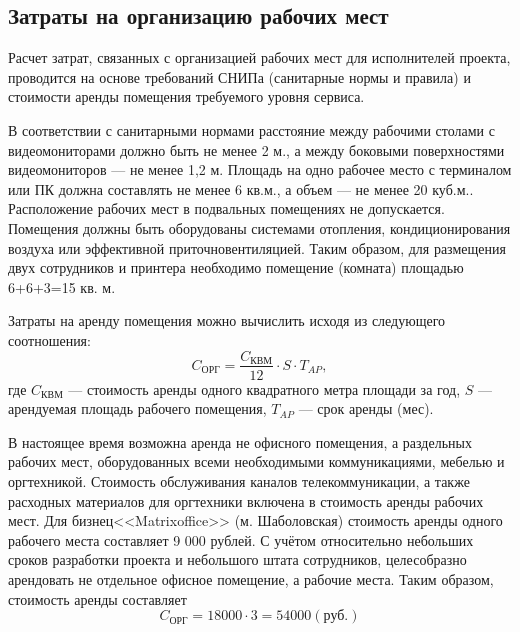 \subsection{Затраты на организацию рабочих мест} \label{office_costs}

Расчет затрат, связанных с организацией рабочих мест для исполнителей проекта, проводится на основе требований СНИПа (санитарные нормы и правила) и стоимости аренды помещения требуемого уровня сервиса.

\vspace{\baselineskip}
В соответствии с санитарными нормами расстояние между рабочими столами с видеомониторами должно быть не менее 2 м., а между боковыми поверхностями видеомониторов --- не менее 1,2 м. Площадь на одно рабочее место с терминалом или ПК должна составлять не менее 6 кв.м., а объем --- не менее 20 куб.м.. Расположение рабочих мест в подвальных помещениях не допускается. Помещения должны быть оборудованы системами отопления, кондиционирования воздуха или эффективной приточно вентиляцией. Таким образом, для размещения двух сотрудников и принтера необходимо помещение (комната) площадью 6+6+3=15 кв. м.

\vspace{\baselineskip}
Затраты на аренду помещения можно вычислить исходя из следующего соотношения:
\begin{equation}
  \label{eq:office_cost_formula}
C_\textrm{ОРГ} = \frac {C_\textrm{КВМ}} {12} \cdot S \cdot T_{AP},
\end{equation}
где $C_\textrm{КВМ}$ --- стоимость аренды одного квадратного метра площади за год, $S$ --- арендуемая площадь рабочего помещения, $T_{AP}$ --- срок аренды (мес).

\vspace{\baselineskip}
В настоящее время возможна аренда не офисного помещения, а раздельных рабочих мест, оборудованных всеми необходимыми коммуникациями, мебелью и оргтехникой. Стоимость обслуживания каналов телекоммуникации, а также расходных материалов для оргтехники включена в стоимость аренды рабочих мест. Для бизнец <<Matrixoffice>> (м. Шаболовская) стоимость аренды одного рабочего места составляет 9 000 рублей. С учётом относительно небольших сроков разработки проекта и небольшого штата сотрудников, целесобразно арендовать не отдельное офисное помещение, а рабочие места.
Таким образом, стоимость аренды составляет
\begin{equation}
  \label{eq:office_cost}
C_\textrm{ОРГ} = 18 000 \cdot 3 = 54000 (\textrm{руб.})
\end{equation}